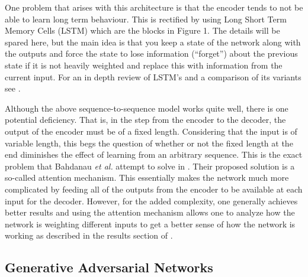 \documentclass[12pt]{article}
\theoremstyle{colon}
\begin{document}
One problem that arises with this architecture is that the encoder tends to not be able to learn long term behaviour. This is rectified by using Long Short Term Memory Cells (LSTM) which are the blocks in Figure 1. The details will be spared here, but the main idea is that you keep a state of the network along with the outputs and force the state to lose information (``forget'') about the previous state if it is not heavily weighted and replace this with information from the current input. For an in depth review of LSTM's and a comparison of its variants see \cite{1503.04069}.

Although the above sequence-to-sequence model works quite well, there is one potential deficiency. That is, in the step from the encoder to the decoder, the output of the encoder must be of a fixed length. Considering that the input is of variable length, this begs the question of whether or not the fixed length at the end diminishes the effect of learning from an arbitrary sequence. This is the exact problem that Bahdanau \textit{et al.} attempt to solve in \cite{1409.0473}. Their proposed solution is a so-called attention mechanism. This essentially makes the network much more complicated by feeding all of the outputs from the encoder to be available at each input for the decoder. However, for the added complexity, one generally achieves better results and using the attention mechanism allows one to analyze how the network is weighting different inputs to get a better sense of how the network is working as described in the results section of \cite{1409.0473}.

\subsection*{Generative Adversarial Networks}
\end{document}

